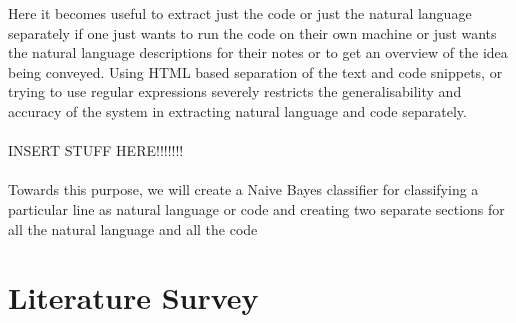 \documentclass[12pt]{scrreprt}
\begin{document}
Here it becomes useful to extract just the code or just the natural language separately if one just wants to run the code on their own machine or just wants the natural language descriptions for their notes or to get an overview of the idea being conveyed. Using HTML based separation of the text and code snippets, or trying to use regular expressions severely restricts the generalisability and accuracy of the system in extracting natural language and code separately.\\
\\ INSERT STUFF HERE!!!!!!!\\
\\ Towards this purpose, we will create a Naive Bayes classifier for classifying a particular line as natural language or code and creating two separate sections for all the natural language and all the code

\chapter{Literature Survey}


\end{document}
